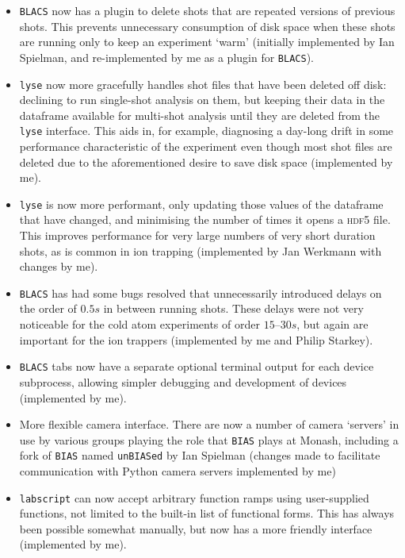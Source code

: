 \begin{itemize}
    \item \texttt{BLACS} now has a plugin to delete shots that are repeated versions of previous shots. This prevents unnecessary consumption of disk space when these shots are running only to keep an experiment `warm' (initially implemented by Ian Spielman, and re-implemented by me as a plugin for \texttt{BLACS}).
    
    \item \texttt{lyse} now more gracefully handles shot files that have been deleted off disk: declining to run single-shot analysis on them, but keeping their data in the dataframe available for multi-shot analysis until they are deleted from the \texttt{lyse} interface. This aids in, for example, diagnosing a day-long drift in some performance characteristic of the experiment even though most shot files are deleted due to the aforementioned desire to save disk space (implemented by me).
    
    \item \texttt{lyse} is now more performant, only updating those values of the dataframe that have changed, and minimising the number of times it opens a \textsc{hdf5} file. This improves performance for very large numbers of very short duration shots, as is common in ion trapping (implemented by Jan Werkmann with changes by me).
    
    \item \texttt{BLACS} has had some bugs resolved that unnecessarily introduced delays on the order of $0.5\unit{s}$ in between running shots. These delays were not very noticeable for the cold atom experiments of order $15\textrm{--}30\unit{s}$, but again are important for the ion trappers (implemented by me and Philip Starkey).
    
    \item \texttt{BLACS} tabs now have a separate optional terminal output for each device subprocess, allowing simpler debugging and development of devices (implemented by me).
    
    \item More flexible camera interface. There are now a number of camera `servers' in use by various groups playing the role that \texttt{BIAS} plays at Monash, including a fork of \texttt{BIAS} named \texttt{unBIASed} by Ian Spielman (changes made to facilitate communication with Python camera servers implemented by me)
    
    \item \texttt{labscript} can now accept arbitrary function ramps using user-supplied functions, not limited to the built-in list of functional forms. This has always been possible somewhat manually, but now has a more friendly interface (implemented by me).
    

\end{itemize}
